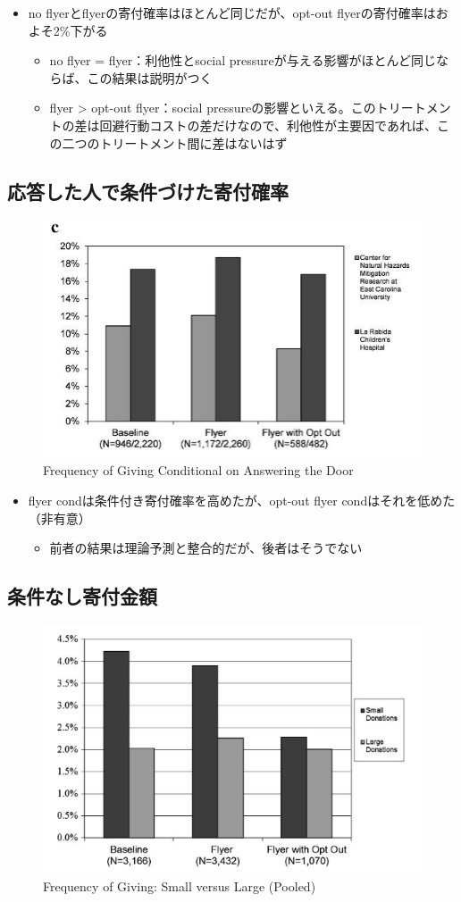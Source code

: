 \documentclass[../root]{subfiles}
\begin{document}
    \begin{itemize}
        \item no flyerとflyerの寄付確率はほとんど同じだが、opt-out flyerの寄付確率はおよそ2\%下がる
        \begin{itemize}
            \item no flyer = flyer：利他性とsocial pressureが与える影響がほとんど同じならば、この結果は説明がつく
            \item flyer > opt-out flyer：social pressureの影響といえる。このトリートメントの差は回避行動コストの差だけなので、利他性が主要因であれば、この二つのトリートメント間に差はないはず
        \end{itemize}
    \end{itemize}

    \subsection{応答した人で条件づけた寄付確率}

    \begin{figure}[h]
        \centering
        \includegraphics[width = .5\linewidth]{0821kato/fig7_2.png}
        \caption{Frequency of Giving Conditional on Answering the Door}
        \label{}
    \end{figure}

    \begin{itemize}
        \item flyer condは条件付き寄付確率を高めたが、opt-out flyer condはそれを低めた（非有意）
        \begin{itemize}
            \item 前者の結果は理論予測と整合的だが、後者はそうでない
        \end{itemize}
    \end{itemize}

    \subsection{条件なし寄付金額}

    \begin{figure}[h]
        \centering
        \includegraphics[width = .5\linewidth]{0821kato/fig8_2.png}
        \caption{Frequency of Giving: Small versus Large (Pooled)}
        \label{}
    \end{figure}
\end{document}
